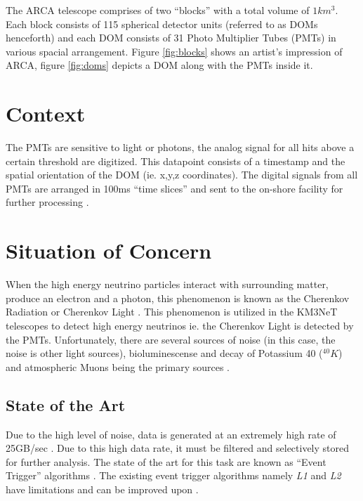The ARCA telescope comprises of two ``blocks'' with a total volume of
$1km^{3}$. Each block consists of 115 spherical detector units (referred to as
DOMs henceforth) and each DOM consists of 31 Photo Multiplier Tubes (PMTs) in
various spacial arrangement. Figure \ref{fig:blocks} shows an artist's
impression of ARCA, figure \ref{fig:doms} depicts a DOM along with the PMTs
inside it.

\section{Context}
The PMTs are sensitive to light or photons, the analog signal for all hits
above a certain threshold are digitized. This datapoint consists of a timestamp
and the spatial orientation of the DOM (ie. x,y,z coordinates). The digital
signals from all PMTs are arranged in 100ms ``time slices'' and sent to the
on-shore facility for further processing \cite{aiello2019km3net}.

\section{Situation of Concern}

When the high energy neutrino particles interact with surrounding matter,
produce an electron and a photon, this phenomenon is known as the Cherenkov
Radiation or Cherenkov Light \cite{margiotta2014km3net}. This phenomenon is
utilized in the KM3NeT telescopes to detect high energy neutrinos ie. the
Cherenkov Light is detected by the PMTs. Unfortunately, there are several
sources of noise (in this case, the noise is other light sources),
bioluminescense and decay of Potassium 40 ($^{40}K$) and atmospheric Muons being
the primary sources \cite{post2019km3nnet}.

\subsection{State of the Art}\label{state-of-the-art}

Due to the high level of noise, data is generated at an extremely high rate of
25GB/sec \cite{adrian2016letter}. Due to this high data rate, it must be
filtered and selectively stored for further analysis. The state of the art for
this task are known as ``Event Trigger'' algorithms
\cite{adrian2016letter,aiello2019km3net}. The existing event trigger algorithms
namely \emph{L1} and \emph{L2} have limitations and can be improved upon
\cite{karas2019data}.

